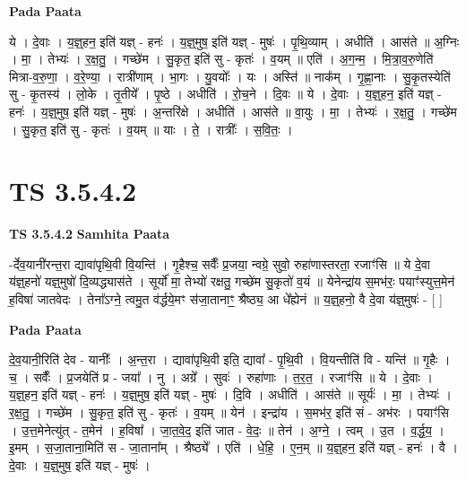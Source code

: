 \documentclass[17pt]{extarticle}
\begin{document}
\textbf{Pada Paata} \newline

ये । दे॒वाः । य॒ज्ञ्॒हन॒ इति॑ यज्ञ् - हनः॑ । य॒ज्ञ्॒मुष॒ इति॑ यज्ञ् - मुषः॑ । पृ॒थि॒व्याम् । अधीति॑ । आस॑ते ॥ अ॒ग्निः । मा॒ । तेभ्यः॑ । र॒क्ष॒तु॒ । गच्छे॑म । सु॒कृत॒ इति॑ सु - कृतः॑ । व॒यम् ॥ एति॑ । अ॒ग॒न्म॒ । मि॒त्रा॒व॒रु॒णेति॑ मित्रा-व॒रु॒णा॒ । व॒रे॒ण्या॒ । रात्री॑णाम् । भा॒गः । यु॒वयोः᳚ । यः । अस्ति॑ ॥ नाक᳚म् । गृ॒ह्णा॒नाः । सु॒कृ॒तस्येति॑ सु - कृ॒तस्य॑ । लो॒के । तृ॒तीये᳚ । पृ॒ष्ठे । अधीति॑ । रो॒च॒ने । दि॒वः ॥ ये । दे॒वाः । य॒ज्ञ्॒हन॒ इति॑ यज्ञ् - हनः॑ । य॒ज्ञ्॒मुष॒ इति॑ यज्ञ् - मुषः॑ । अ॒न्तरि॑क्षे । अधीति॑ । आस॑ते ॥ वा॒युः । मा॒ । तेभ्यः॑ । र॒क्ष॒तु॒ । गच्छे॑म । सु॒कृत॒ इति॑ सु - कृतः॑ । व॒यम् ॥ याः । ते॒ । रात्रीः᳚ । स॒वि॒तः॒ ।  \newline




\section*{ TS 3.5.4.2 }

\textbf{TS 3.5.4.2 } \newline
\textbf{Samhita Paata} \newline

-र्देव॒यानी॑रन्त॒रा द्यावा॑पृथि॒वी वि॒यन्ति॑ । गृ॒हैश्च॒ सर्वैः᳚ प्र॒जया॒ न्वग्रे॒ सुवो॒ रुहा॑णास्तरता॒ रजाꣳ॑सि ॥ ये दे॒वा य॑ज्ञ्॒हनो॑ यज्ञ्॒मुषो॑ दि॒व्यद्ध्यास॑ते । सूर्यो॑ मा॒ तेभ्यो॑ रक्षतु॒ गच्छे॑म सु॒कृतो॑ व॒यं ॥ येनेन्द्रा॑य स॒मभ॑रः॒ पयाꣳ॑स्युत्त॒मेन॑ ह॒विषा॑ जातवेदः । तेना᳚ऽग्ने॒ त्वमु॒त व॑र्द्धये॒मꣳ स॑जा॒तानाꣳ॒॒ श्रैष्ठ्य॒ आ धे᳚ह्येनं ॥ य॒ज्ञ्॒हनो॒ वै दे॒वा य॑ज्ञ्॒मुषः॑ - [  ] \newline

\textbf{Pada Paata} \newline

दे॒व॒यानी॒रिति॑ देव - यानीः᳚ । अ॒न्त॒रा । द्यावा॑पृथि॒वी इति॒ द्यावा᳚ - पृ॒थि॒वी । वि॒यन्तीति॑ वि - यन्ति॑ ॥ गृ॒हैः । च॒ । सर्वैः᳚ । प्र॒जयेति॑ प्र - जया᳚ । नु । अग्रे᳚ । सुवः॑ । रुहा॑णाः । त॒र॒त॒ । रजाꣳ॑सि ॥ ये । दे॒वाः । य॒ज्ञ्॒हन॒ इति॑ यज्ञ् - हनः॑ । य॒ज्ञ्॒मुष॒ इति॑ यज्ञ् - मुषः॑ । दि॒वि । अधीति॑ । आस॑ते ॥ सूर्यः॑ । मा॒ । तेभ्यः॑ । र॒क्ष॒तु॒ । गच्छे॑म । सु॒कृत॒ इति॑ सु - कृतः॑ । व॒यम् ॥ येन॑ । इन्द्रा॑य । स॒मभ॑र॒ इति॑ सं - अभ॑रः । पयाꣳ॑सि । उ॒त्त॒मेनेत्यु॑त् - त॒मेन॑ । ह॒विषा᳚ । जा॒त॒वे॒द॒ इति॑ जात - वे॒दः॒ ॥ तेन॑ । अ॒ग्ने॒ । त्वम् । उ॒त । व॒र्द्ध॒य॒ । इ॒मम् । स॒जा॒ताना॒मिति॑ स - जा॒ताना᳚म् । श्रैष्ठ्ये᳚ । एति॑ । धे॒हि॒ । ए॒न॒म् ॥ य॒ज्ञ्॒हन॒ इति॑ यज्ञ् - हनः॑ । वै । दे॒वाः । य॒ज्ञ्॒मुष॒ इति॑ यज्ञ् - मुषः॑ ।  \newline
\end{document}
